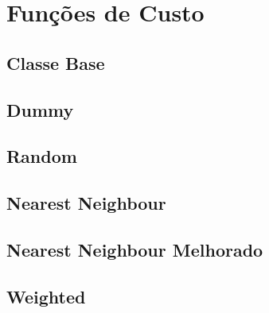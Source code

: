 \lipsum[1]

\section{Funções de Custo}

\lipsum[1]

\subsection{Classe Base}

\lipsum[1]

\subsection{Dummy}

\lipsum[1]

\subsection{Random}

\lipsum[1]

\subsection{Nearest Neighbour}

\lipsum[1]

\subsection{Nearest Neighbour Melhorado}

\lipsum[1]

\subsection{Weighted}

\lipsum[1]